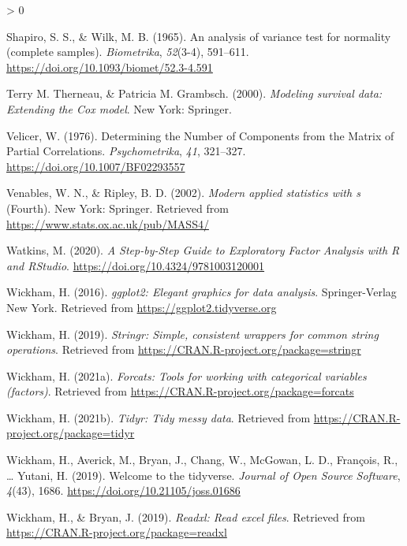 \documentclass[
  english,
  man]{apa6}
\newlength{\cslhangindent}
\newenvironment{CSLReferences}[2] %
 {%
  \setlength{\parindent}{0pt}
  \ifodd #1 \everypar{\setlength{\hangindent}{\cslhangindent}}\ignorespaces\fi
  \ifnum #2 > 0
  \setlength{\parskip}{#2\baselineskip}
  \fi
 }%
 {}
\begin{document}
\begin{CSLReferences}{1}{0}
\leavevmode\hypertarget{ref-shapiroAnalysisVarianceTest1965}{}%
Shapiro, S. S., \& Wilk, M. B. (1965). An analysis of variance test for normality (complete samples). \emph{Biometrika}, \emph{52}(3-4), 591--611. \url{https://doi.org/10.1093/biomet/52.3-4.591}

\leavevmode\hypertarget{ref-R-survival-book}{}%
Terry M. Therneau, \& Patricia M. Grambsch. (2000). \emph{Modeling survival data: Extending the {C}ox model}. New York: Springer.

\leavevmode\hypertarget{ref-velicerDeterminingNumberComponents1976}{}%
Velicer, W. (1976). Determining the {Number} of {Components} from the {Matrix} of {Partial Correlations}. \emph{Psychometrika}, \emph{41}, 321--327. \url{https://doi.org/10.1007/BF02293557}

\leavevmode\hypertarget{ref-R-MASS}{}%
Venables, W. N., \& Ripley, B. D. (2002). \emph{Modern applied statistics with s} (Fourth). New York: Springer. Retrieved from \url{https://www.stats.ox.ac.uk/pub/MASS4/}

\leavevmode\hypertarget{ref-watkinsStepbyStepGuideExploratory2020}{}%
Watkins, M. (2020). \emph{A {Step}-by-{Step Guide} to {Exploratory Factor Analysis} with {R} and {RStudio}}. \url{https://doi.org/10.4324/9781003120001}

\leavevmode\hypertarget{ref-R-ggplot2}{}%
Wickham, H. (2016). \emph{ggplot2: Elegant graphics for data analysis}. Springer-Verlag New York. Retrieved from \url{https://ggplot2.tidyverse.org}

\leavevmode\hypertarget{ref-R-stringr}{}%
Wickham, H. (2019). \emph{Stringr: Simple, consistent wrappers for common string operations}. Retrieved from \url{https://CRAN.R-project.org/package=stringr}

\leavevmode\hypertarget{ref-R-forcats}{}%
Wickham, H. (2021a). \emph{Forcats: Tools for working with categorical variables (factors)}. Retrieved from \url{https://CRAN.R-project.org/package=forcats}

\leavevmode\hypertarget{ref-R-tidyr}{}%
Wickham, H. (2021b). \emph{Tidyr: Tidy messy data}. Retrieved from \url{https://CRAN.R-project.org/package=tidyr}

\leavevmode\hypertarget{ref-R-tidyverse}{}%
Wickham, H., Averick, M., Bryan, J., Chang, W., McGowan, L. D., François, R., \ldots{} Yutani, H. (2019). Welcome to the {tidyverse}. \emph{Journal of Open Source Software}, \emph{4}(43), 1686. \url{https://doi.org/10.21105/joss.01686}

\leavevmode\hypertarget{ref-R-readxl}{}%
Wickham, H., \& Bryan, J. (2019). \emph{Readxl: Read excel files}. Retrieved from \url{https://CRAN.R-project.org/package=readxl}


\end{CSLReferences}
\end{document}
